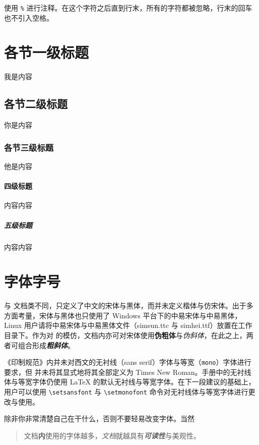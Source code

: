 使用 \verb|%| 进行注释。在这个字符之后直到行末，所有的字符都被忽略，行末的回车也不引入空格。%

\section{各节一级标题}
我是内容

\subsection{各节二级标题}
你是内容

\subsubsection{各节三级标题}
他是内容

\paragraph{四级标题}
内容内容

\subparagraph{五级标题}
内容内容


\section{字体字号}
与 \CTeX 文档类不同，\WhuThesis 只定义了中文的宋体与{\heiti 黑体}，而并未定义楷体与仿宋体。出于多方面考量，宋体与黑体也只使用了 Windows 平台下的中易宋体与中易黑体，Linux 用户请将中易宋体与中易黑体文件（simsun.ttc 与 simhei.ttf）放置在工作目录下。作为对  的模仿，文档内亦可对宋体使用\textbf{伪粗体}与\textit{伪斜体}，在此之上，两者可组合形成\textbf{\textit{粗斜体}}。

\begin{notice}
    《印制规范》内并未对西文的无衬线（\textsf{sans serif}）字体与等宽（\texttt{mono}）字体进行要求，但 \WhuThesis 并未将其显式地将其全部定义为 Times New Roman。手册中的无衬线体与等宽字体仍使用 \LaTeX{} 的默认无衬线与等宽字体。在下一段建议的基础上，用户可以使用 \verb|\setsansfont| 与 \verb|\setmonofont| 命令对无衬线体与等宽字体进行更改与使用。

    除非你非常清楚自己在干什么，否则不要轻易改变字体。当然\\
    \begin{quote}
        文档\textbf{内}{\tiny 使用}的字体越{\huge \textsf{多}}，\textit{文档}就越具有\textbf{\textit{可读性}}{\large 与}{\Large 美}{\huge 观}{\Huge 性}。
    \end{quote}
\end{notice}

